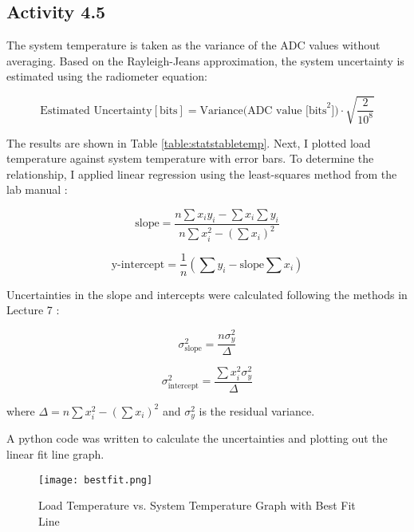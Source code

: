 \documentclass[10pt, preprint]{aastex}
\begin{document}
\subsection{Activity 4.5}

The system temperature is taken as the variance of the ADC values without averaging. Based on the Rayleigh-Jeans approximation, the system uncertainty is estimated using the radiometer equation:

\begin{equation}
\text{Estimated Uncertainty}[\text{bits}] = \text{Variance(ADC value [bits}^2\text{])} \cdot \sqrt{\frac{2}{10^8}}
\end{equation}

The results are shown in Table \ref{table:statstabletemp}. 
Next, I plotted load temperature against system temperature with error bars. To determine the relationship, I applied linear regression using the least-squares method from the lab manual \cite{labmanual}:

\begin{equation}
\text{slope} = \frac{n \sum x_i y_i - \sum x_i \sum y_i}{n \sum x_i^2 - (\sum x_i)^2} 
\end{equation}

\begin{equation}
\text{y-intercept} = \frac{1}{n} \left( \sum y_i - \text{slope} \sum x_i \right)
\end{equation}

Uncertainties in the slope and intercepts were calculated following the methods in Lecture 7 \cite{ast325lecture7}:

\begin{equation}
\sigma_{\text{slope}}^2 = \frac{n \sigma_y^2}{\Delta} 
\end{equation}

\begin{equation}
\sigma_{\text{intercept}}^2 = \frac{\sum x_i^2 \sigma_y^2}{\Delta} 
\end{equation}

where \(\Delta = n \sum x_i^2 - (\sum x_i)^2\) and \(\sigma_y^2\) is the residual variance.

A python code was written to calculate the uncertainties and plotting out the linear fit line graph.

\begin{figure}[H]
\centering
\texttt{[image: bestfit.png]}
\caption{\label{fig:bestfit}Load Temperature vs. System Temperature Graph with Best Fit Line}
\end{figure}
\end{document}
